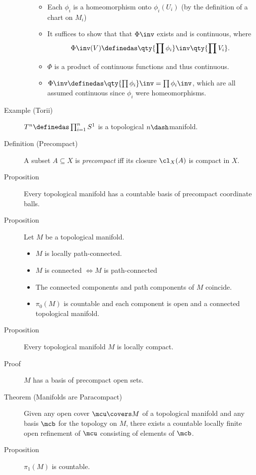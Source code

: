 \begin{description}
\begin{itemize}
  \begin{itemize}
  \tightlist
  \item
    Each \(\phi_i\) is a homeomorphism onto \(\phi_i(U_i)\) (by the
    definition of a chart on \(M_i\))
  \item
    It suffices to show that that \(\Phi\inv\) exists and is continuous,
    where \begin{align*}
    \Phi\inv(V) \definedas \qty{\prod \phi_i}\inv \qty{\prod V_i}
    .\end{align*}
  \item
    \(\Phi\) is a product of continuous functions and thus continuous.
  \item
    \(\Phi\inv \definedas \qty{\prod \phi_i}\inv = \prod \phi_i\inv\),
    which are all assumed continuous since \(\phi_i\) were
    homeomorphisms.
  \end{itemize}
\end{itemize}
\item[Example (Torii)]
\(T^n \definedas \prod_{i=1}^n S^1\) is a topological
\(n\dash\)manifold.
\item[Definition (Precompact)]
A subset \(A\subseteq X\) is \emph{precompact} iff its closure
\(\cl_X(A)\) is compact in \(X\).
\item[Proposition]
Every topological manifold has a countable basis of precompact
coordinate balls.
\item[Proposition]
Let \(M\) be a topological manifold.

\begin{itemize}
\tightlist
\item
  \(M\) is locally path-connected.
\item
  \(M\) is connected \(\iff M\) is path-connected
\item
  The connected components and path components of \(M\) coincide.
\item
  \(\pi_0(M)\) is countable and each component is open and a connected
  topological manifold.
\end{itemize}
\item[Proposition]
Every topological manifold \(M\) is locally compact.
\item[Proof]
\(M\) has a basis of precompact open sets.
\item[Theorem (Manifolds are Paracompact)]
Given any open cover \(\mcu \covers M\) of a topological manifold and
any basis \(\mcb\) for the topology on \(M\), there exists a countable
locally finite open refinement of \(\mcu\) consisting of elements of
\(\mcb\).
\item[Proposition]
\(\pi_1(M)\) is countable.
\end{description}

